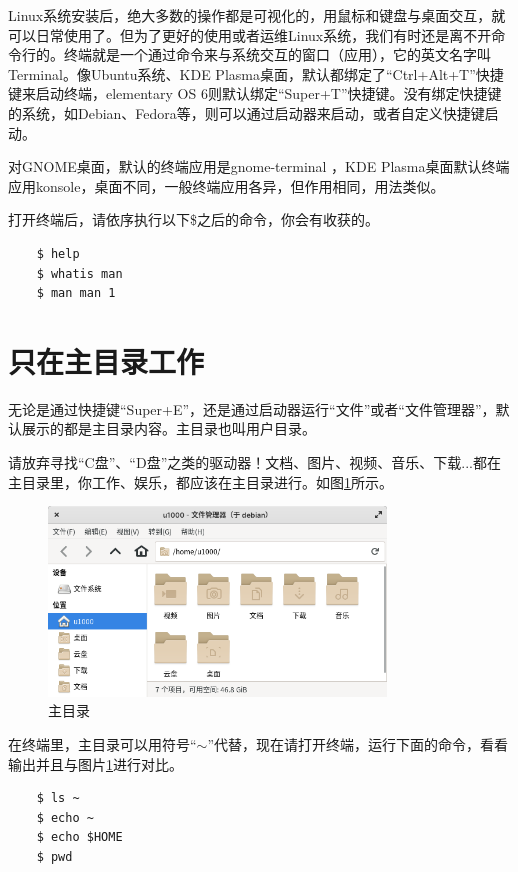 \par Linux系统安装后，绝大多数的操作都是可视化的，用鼠标和键盘与桌面交互，就可以日常使用了。但为了更好的使用或者运维Linux系统，我们有时还是离不开命令行的。终端就是一个通过命令来与系统交互的窗口（应用），它的英文名字叫Terminal。像Ubuntu系统、KDE Plasma桌面，默认都绑定了“Ctrl+Alt+T”快捷键来启动终端，elementary OS 6则默认绑定“Super+T”快捷键。没有绑定快捷键的系统，如Debian、Fedora等，则可以通过启动器来启动，或者自定义快捷键启动。
\par 对GNOME桌面，默认的终端应用是gnome-terminal ，KDE Plasma桌面默认终端应用konsole，桌面不同，一般终端应用各异，但作用相同，用法类似。
\par 打开终端后，请依序执行以下\$之后的命令，你会有收获的。
\begin{lstlisting}
    $ help
    $ whatis man
    $ man man 1
\end{lstlisting}


\section{只在主目录工作}

\par 无论是通过快捷键“Super+E”，还是通过启动器运行“文件”或者“文件管理器”，默认展示的都是主目录内容。主目录也叫用户目录。
\par 请放弃寻找“C盘”、“D盘”之类的驱动器！文档、图片、视频、音乐、下载...都在主目录里，你工作、娱乐，都应该在主目录进行。如图\ref{fig:2021-10-28_22-31-38}所示。

\begin{figure} [htbp]
	\centering
	\includegraphics [width=0.8\textwidth]{images/ch01/2021-10-28_22-31-38.png}
	\caption{主目录}
	\label{fig:2021-10-28_22-31-38}
\end{figure}

\par 在终端里，主目录可以用符号“$\sim$”代替，现在请打开终端，运行下面的命令，看看输出并且与图片\ref{fig:2021-10-28_22-31-38}进行对比。
\begin{lstlisting}
    $ ls ~
    $ echo ~
    $ echo $HOME
    $ pwd
\end{lstlisting}

